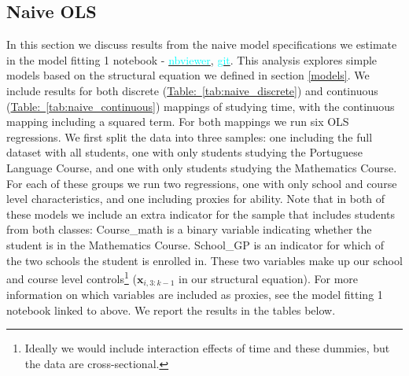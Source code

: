 \documentclass[12pt]{article}
\begin{document}
\subsection{Naive OLS}
In this section we discuss results from the naive model specifications we estimate in the model fitting 1 notebook -  \href{https://nbviewer.jupyter.org/github/nadavtadelis/Reproducible_Metrics/blob/master/model_fitting_1.ipynb}{\textcolor{cyan}{nbviewer}}, \href{https://github.com/nadavtadelis/Reproducible_Metrics/blob/master/model_fitting_1.ipynb}{\textcolor{cyan}{git}}. This analysis explores simple models based on the structural equation we defined in section \ref{models}. We include results for both discrete (\hyperref[tab:naive_discrete]{Table:~\ref*{tab:naive_discrete}}) and continuous (\hyperref[tab:naive_continuous]{Table:~\ref*{tab:naive_continuous}}) mappings of studying time, with the continuous mapping including a squared term. For both mappings we run six OLS regressions. We first split the data into three samples: one including the full dataset with all students, one with only students studying the Portuguese Language Course, and one with only students studying the Mathematics Course. For each of these groups we run two regressions, one with only school and course level characteristics, and one including proxies for ability. Note that in both of these models we include an extra indicator for the sample that includes students from both classes: Course\_math is a binary variable indicating whether the student is in the Mathematics Course. School\_GP is an indicator for which of the two schools the student is enrolled in. These two variables make up our school and course level controls\footnote{Ideally we would include interaction effects of time and these dummies, but the data are cross-sectional.} ($\bm{x}_{i,3:k-1}$ in our structural equation). For more information on which variables are included as proxies, see the model fitting 1 notebook linked to above. We report the results in the tables below.
\end{document}
